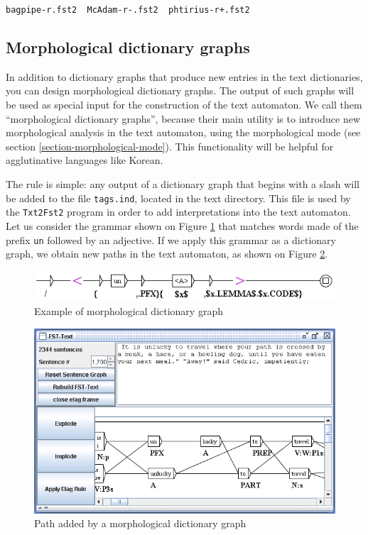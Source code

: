\bigskip
\verb?bagpipe-r.fst2  McAdam-r-.fst2  phtirius-r+.fst2?

\subsection{Morphological dictionary graphs}
In addition to dictionary graphs that produce new entries in the text
dictionaries, you can design morphological dictionary graphs. The output
of such graphs will be used as special input for the construction of the text
automaton. We call them ``morphological dictionary graphs'', because their
main utility is to introduce new morphological analysis in the text automaton,
using the morphological mode (see section \ref{section-morphological-mode}).
This functionality will be helpful for agglutinative languages like Korean.

\bigskip
\noindent The rule is simple: any output of a dictionary graph that begins
with a slash will be added to the file \verb+tags.ind+, 
located in the text directory. This file is used by the \verb+Txt2Fst2+ program
in order to add interpretations into the text automaton. Let us consider the
grammar shown on Figure \ref{morphoA} that matches words made of the prefix
\verb+un+ followed by an adjective. If we apply this grammar as a dictionary
graph, we obtain new paths in the text automaton, as shown on Figure
\ref{morphoB}.

\begin{figure}[!ht]
\begin{center}
\includegraphics[width=14cm]{resources/img/fig3-12a.png}
\caption{Example of morphological dictionary graph\label{morphoA}}
\end{center}
\end{figure}

\begin{figure}[!ht]
\begin{center}
\includegraphics[width=15cm]{resources/img/fig3-12b.png}
\caption{Path added by a morphological dictionary
graph\label{morphoB}}
\end{center}
\end{figure}


